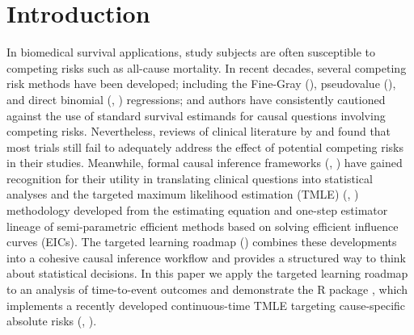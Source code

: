 \documentclass{report}
\newcommand{\1}{\ensuremath{\mathbf{1}}}
\begin{document}
\section{Introduction}
\label{intro}
In biomedical survival applications, study subjects are often susceptible to competing risks such as all-cause mortality. In recent decades, several competing risk methods have been developed; including the Fine-Gray (\cite{fine_proportional_1999}), pseudovalue (\cite{klein_regression_2005}), and direct binomial (\cite{scheike_predicting_2008}, \cite{gerds_absolute_2012}) regressions; and authors have consistently cautioned against the use of standard survival estimands for causal questions involving competing risks. Nevertheless, reviews of clinical literature by \cite{koller_competing_2012} and \cite{austin_accounting_2017} found that most trials still fail to adequately address the effect of potential competing risks in their studies. Meanwhile, formal causal inference frameworks (\cite{holland_statistics_1986}, \cite{pearl_causal_2016}) have gained recognition for their utility in translating clinical questions into statistical analyses and the targeted maximum likelihood estimation (TMLE) (\cite{laan_targeted_2011}, \cite{laan_targeted_2018}) methodology developed from the estimating equation and one-step estimator lineage of semi-parametric efficient methods based on solving efficient influence curves (EICs). The targeted learning roadmap (\cite{petersen_causal_2014}) combines these developments into a cohesive causal inference workflow and provides a structured way to think about statistical decisions. In this paper we apply the targeted learning roadmap to an analysis of time-to-event outcomes and demonstrate the R package , which implements a recently developed continuous-time TMLE targeting cause-specific absolute risks (\cite{rytgaard_estimation_2021}, \cite{rytgaard_one-step_2021}).
\end{document}
